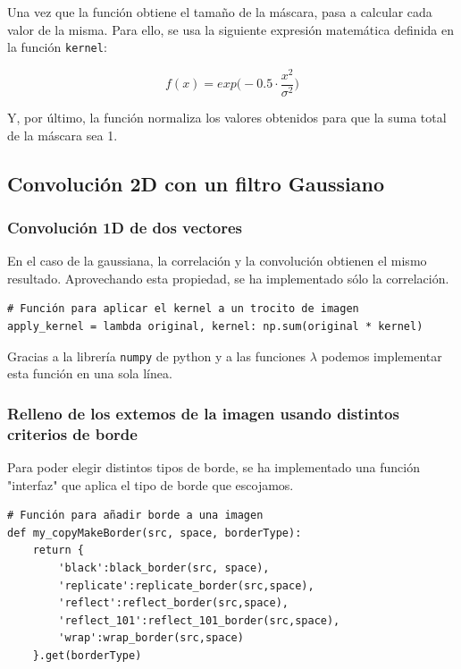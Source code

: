 \documentclass[11pt,a4paper]{article}
\theoremstyle{plain}
\theoremstyle{definition}
\begin{document}
Una vez que la función obtiene el tamaño de la máscara, pasa a calcular cada valor de la misma. Para ello, se usa la siguiente expresión matemática definida en la función \texttt{kernel}:

\begin{displaymath}
 f(x) = exp \Bigg(-0.5 \cdot \frac{x^2}{\sigma^2} \Bigg)
 \end{displaymath}

Y, por último, la función normaliza los valores obtenidos para que la suma total de la máscara sea 1.

\subsection{Convolución 2D con un filtro Gaussiano}
\subsubsection{Convolución 1D de dos vectores}

En el caso de la gaussiana, la correlación y la convolución obtienen el mismo resultado. Aprovechando esta propiedad, se ha implementado sólo la correlación.

\begin{verbatim}
# Función para aplicar el kernel a un trocito de imagen
apply_kernel = lambda original, kernel: np.sum(original * kernel)
\end{verbatim}

Gracias a la librería \texttt{numpy} de python y a las funciones $\lambda$ podemos implementar esta función en una sola línea.

\subsubsection{Relleno de los extemos de la imagen usando distintos criterios de borde}

Para poder elegir distintos tipos de borde, se ha implementado una función "interfaz" que aplica el tipo de borde que escojamos.

\begin{verbatim}
# Función para añadir borde a una imagen
def my_copyMakeBorder(src, space, borderType):
    return {
        'black':black_border(src, space),
        'replicate':replicate_border(src,space),
        'reflect':reflect_border(src,space),
        'reflect_101':reflect_101_border(src,space),
        'wrap':wrap_border(src,space)
    }.get(borderType)
\end{verbatim}
\end{document}
